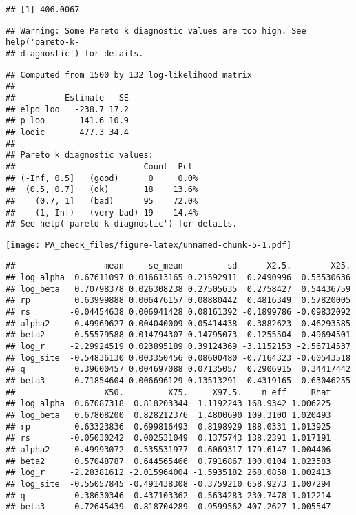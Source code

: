 \documentclass[12pt,]{article}
\begin{document}
\begin{verbatim}
## [1] 406.0067
\end{verbatim}

\begin{verbatim}
## Warning: Some Pareto k diagnostic values are too high. See help('pareto-k-
## diagnostic') for details.
\end{verbatim}

\begin{verbatim}
## Computed from 1500 by 132 log-likelihood matrix
## 
##          Estimate   SE
## elpd_loo   -238.7 17.2
## p_loo       141.6 10.9
## looic       477.3 34.4
## 
## Pareto k diagnostic values:
##                          Count  Pct 
## (-Inf, 0.5]   (good)      0     0.0%
##  (0.5, 0.7]   (ok)       18    13.6%
##    (0.7, 1]   (bad)      95    72.0%
##    (1, Inf)   (very bad) 19    14.4%
## See help('pareto-k-diagnostic') for details.
\end{verbatim}

\texttt{[image: PA\_check\_files/figure-latex/unnamed-chunk-5-1.pdf]}

\begin{verbatim}
##                  mean     se_mean         sd      X2.5.        X25.
## log_alpha  0.67611097 0.016613165 0.21592911  0.2490996  0.53530636
## log_beta   0.70798378 0.026308238 0.27505635  0.2758427  0.54436759
## rp         0.63999888 0.006476157 0.08880442  0.4816349  0.57820005
## rs        -0.04454638 0.006941428 0.08161392 -0.1899786 -0.09832092
## alpha2     0.49969627 0.004040009 0.05414438  0.3882623  0.46293585
## beta2      0.55579588 0.014794307 0.14795073  0.1255504  0.49694501
## log_r     -2.29924519 0.023895189 0.39124369 -3.1152153 -2.56714537
## log_site  -0.54836130 0.003350456 0.08600480 -0.7164323 -0.60543518
## q          0.39600457 0.004697088 0.07135057  0.2906915  0.34417442
## beta3      0.71854604 0.006696129 0.13513291  0.4319165  0.63046255
##                  X50.         X75.     X97.5.    n_eff     Rhat
## log_alpha  0.67087318  0.818203344  1.1192243 168.9342 1.006225
## log_beta   0.67808200  0.828212376  1.4800690 109.3100 1.020493
## rp         0.63323836  0.699816493  0.8198929 188.0331 1.013925
## rs        -0.05030242  0.002531049  0.1375743 138.2391 1.017191
## alpha2     0.49993072  0.535531977  0.6069317 179.6147 1.004406
## beta2      0.57048787  0.644565466  0.7916867 100.0104 1.023583
## log_r     -2.28381612 -2.015964004 -1.5935182 268.0858 1.002413
## log_site  -0.55057845 -0.491438308 -0.3759210 658.9273 1.007294
## q          0.38630346  0.437103362  0.5634283 230.7478 1.012214
## beta3      0.72645439  0.818704289  0.9599562 407.2627 1.005547
\end{verbatim}
\end{document}
